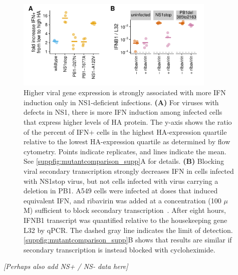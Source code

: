 \documentclass[10pt,letterpaper]{article}
\newcommand{\SUPPFIG}[1]{\autoref{suppfig:#1}}
\newcommand{\jdbcomment}[1]{\emph{\color{red} [#1]}}
\begin{document}
\begin{figure}
\centerline{\includegraphics[width=0.85\textwidth]{figures/MutantComparison/p_merged.pdf}}
\caption{
Higher viral gene expression is strongly associated with more IFN induction only in NS1-deficient infections.
{\bf (A)}
For viruses with defects in NS1, there is more IFN induction among infected cells that express higher levels of HA protein.
The y-axis shows the ratio of the percent of IFN+ cells in the highest HA-expression quartile relative to the lowest HA-expression quartile as determined by flow cytometry.
Points indicate replicates, and lines indicate the mean.
See \SUPPFIG{mutantcomparison_supp}A for details.
{\bf (B)}
Blocking viral secondary transcription strongly decreases IFN in cells infected with NS1stop virus, but not cells infected with virus carrying a deletion in PB1.
A549 cells were infected at doses that induced equivalent IFN, and ribavirin was added at a concentration (100 $\mu$M) sufficient to block secondary transcription~\citep{Vanderlinden:2016ec,reuther2015generation,Scholtissek:1976wg}.
After eight hours, IFNB1 transcript was quantified relative to the housekeeping gene L32 by qPCR. 
The dashed gray line indicates the limit of detection.
\SUPPFIG{mutantcomparison_supp}B shows that results are similar if secondary transcription is instead blocked with cycloheximide.
}
\label{fig:mutantcomparison}
\end{figure}


\jdbcomment{Perhaps also add NS+ / NS- data here}
 
\end{document}
